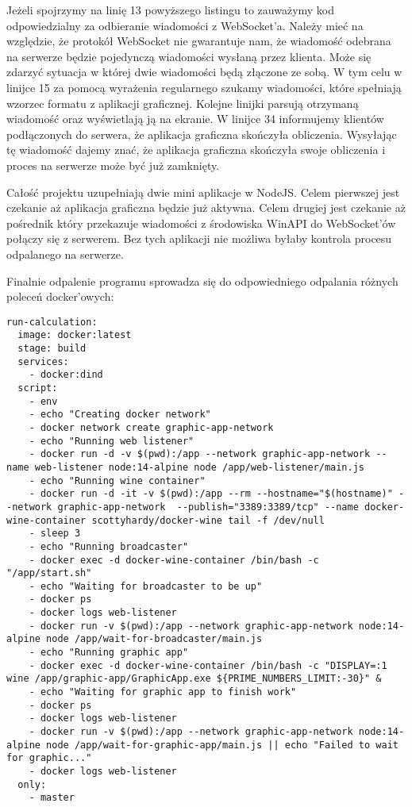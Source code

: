 Jeżeli spojrzymy na linię 13 powyższego listingu to zauważymy kod odpowiedzialny za odbieranie wiadomości z WebSocket'a. Należy mieć na względzie, że protokół WebSocket nie gwarantuje nam, że wiadomość odebrana na serwerze będzie pojedynczą wiadomości wysłaną przez klienta. Może się zdarzyć sytuacja w której dwie wiadomości będą złączone ze sobą. W tym celu w linijce 15 za pomocą wyrażenia regularnego szukamy wiadomości, które spełniają wzorzec formatu z aplikacji graficznej. Kolejne linijki parsują otrzymaną wiadomość oraz wyświetlają ją na ekranie. W linijce 34 informujemy klientów podłączonych do serwera, że aplikacja graficzna skończyła obliczenia. Wysyłając tę wiadomość dajemy znać, że aplikacja graficzna skończyła swoje obliczenia i proces na serwerze może być już zamknięty.
\par
Całość projektu uzupełniają dwie mini aplikacje w NodeJS. Celem pierwszej jest czekanie aż aplikacja graficzna będzie już aktywna. Celem drugiej jest czekanie aż pośrednik który przekazuje wiadomości z środowiska WinAPI do WebSocket'ów połączy się z serwerem. Bez tych aplikacji nie możliwa byłaby kontrola procesu odpalanego na serwerze.
\par
Finalnie odpalenie programu sprowadza się do odpowiedniego odpalania różnych poleceń docker'owych:
\begin{lstlisting}[caption={.gitlab-ci.yml - konfiguracji procesu automatyzującego}]
run-calculation:
  image: docker:latest
  stage: build
  services:
    - docker:dind
  script:
    - env
    - echo "Creating docker network"
    - docker network create graphic-app-network
    - echo "Running web listener"
    - docker run -d -v $(pwd):/app --network graphic-app-network --name web-listener node:14-alpine node /app/web-listener/main.js
    - echo "Running wine container"
    - docker run -d -it -v $(pwd):/app --rm --hostname="$(hostname)" --network graphic-app-network  --publish="3389:3389/tcp" --name docker-wine-container scottyhardy/docker-wine tail -f /dev/null
    - sleep 3
    - echo "Running broadcaster"
    - docker exec -d docker-wine-container /bin/bash -c "/app/start.sh"
    - echo "Waiting for broadcaster to be up"
    - docker ps
    - docker logs web-listener
    - docker run -v $(pwd):/app --network graphic-app-network node:14-alpine node /app/wait-for-broadcaster/main.js
    - echo "Running graphic app"
    - docker exec -d docker-wine-container /bin/bash -c "DISPLAY=:1 wine /app/graphic-app/GraphicApp.exe ${PRIME_NUMBERS_LIMIT:-30}" &
    - echo "Waiting for graphic app to finish work"
    - docker ps
    - docker logs web-listener
    - docker run -v $(pwd):/app --network graphic-app-network node:14-alpine node /app/wait-for-graphic-app/main.js || echo "Failed to wait for graphic..."
    - docker logs web-listener
  only:
    - master
\end{lstlisting}
